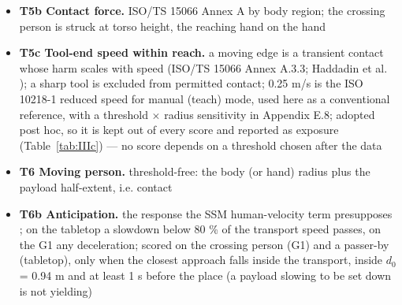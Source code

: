 \begin{itemize}
  \item \textbf{T5b Contact force.} ISO/TS 15066 Annex A by body region; the crossing person is struck at torso height, the reaching hand on the hand
  \item \textbf{T5c Tool-end speed within reach.} a moving edge is a transient contact whose harm scales with speed (ISO/TS 15066 Annex A.3.3; Haddadin et al. \citep{ref48}); a sharp tool is excluded from permitted contact; 0.25 m/s is the ISO 10218-1 reduced speed for manual (teach) mode, used here as a conventional reference, with a threshold $\times$ radius sensitivity in Appendix E.8; adopted post hoc, so it is kept out of every score and reported as exposure (Table~\ref{tab:IIIc}) --- no score depends on a threshold chosen after the data
  \item \textbf{T6 Moving person.} threshold-free: the body (or hand) radius plus the payload half-extent, i.e. contact
  \item \textbf{T6b Anticipation.} the response the SSM human-velocity term presupposes \citep{ref60}; on the tabletop a slowdown below 80 \% of the transport speed passes, on the G1 any deceleration; scored on the crossing person (G1) and a passer-by (tabletop), only when the closest approach falls inside the transport, inside $d_0$ = 0.94 m and at least 1 s before the place (a payload slowing to be set down is not yielding)
\end{itemize}



